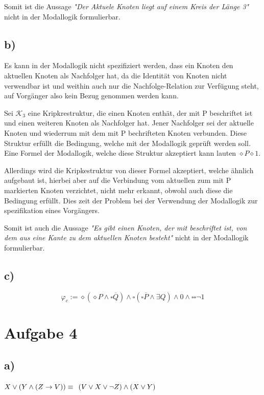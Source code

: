 \documentclass[11pt, a4paper]{article}
\renewcommand{\v}{\vee}
\newcommand{\n}{\wedge}
\begin{document}
Somit ist die Aussage \textit{"Der Aktuele Knoten liegt auf einem Kreis der Länge 3"} nicht in der Modallogik formulierbar.

\subsection*{b)}
Es kann in der Modallogik nicht spezifiziert werden, dass ein Knoten den aktuellen Knoten als Nachfolger hat, da die Identität von Knoten nicht verwendbar ist und weithin auch nur die Nachfolge-Relation zur Verfügung steht, auf Vorgänger also kein Bezug genommen werden kann.

Sei $\mathcal{K}_3$ eine Kripkrestruktur, die einen Knoten enthät, der mit P beschriftet ist und einen weiteren Knoten als Nachfolger hat.
Jener Nachfolger sei der aktuelle Knoten und wiederrum mit dem mit P bechrifteten Knoten verbunden.
Diese Struktur erfüllt die Bedingung, welche mit der Modallogik geprüft werden soll.
Eine Formel der Modallogik, welche diese Struktur akzeptiert kann lauten $\diamond P \diamond 1$.

Allerdings wird die Kripkestruktur von dieser Formel akzeptiert, welche ähnlich aufgebaut ist, hierbei aber auf die Verbindung vom aktuellen zum mit P markierten Knoten verzichtet, nicht mehr erkannt, obwohl auch diese die Bedingung erfüllt.
Dies zeit der Problem bei der Verwendung der Modallogik zur spezifikation eines Vorgängers.

Somit ist auch die Aussage \textit{"Es gibt einen Knoten, der mit  beschriftet ist, von dem aus eine Kante zu dem aktuellen Knoten besteht"} nicht in der Modallogik formulierbar.

\subsection*{c)}
\[
    \varphi_c := \diamond ( \diamond P \n \square \overline{Q} ) \n \square ( \square \overline{P} \n \exists Q) \n 0 \n \square \square \neg 1
\]

\section*{Aufgabe 4}

\subsection*{a)}
$X \v (Y \n (Z \rightarrow V)) \equiv\\$
$(V \v X \v \neg Z) \n (X \v Y)\\$
\end{document}
